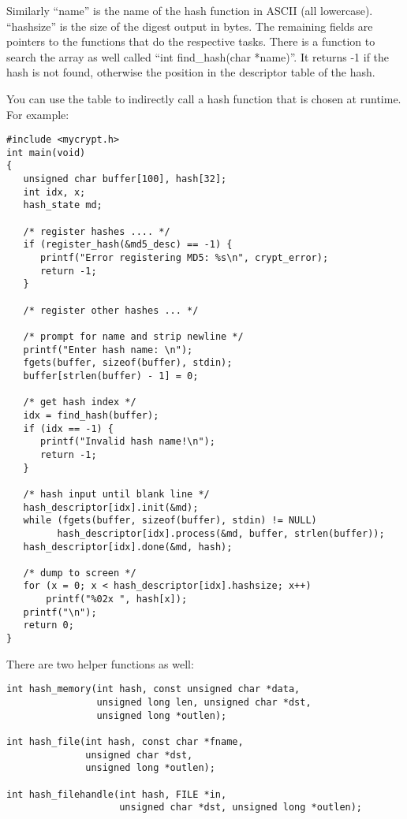 \documentclass{book}
\begin{document}
Similarly ``name'' is the name of the hash function in ASCII (all lowercase).  ``hashsize'' is the size of the digest output
in bytes.  The remaining fields are pointers to the functions that do the respective tasks.  There is a function to
search the array as well called ``int find\_hash(char *name)''.  It returns -1 if the hash is not found, otherwise the
position in the descriptor table of the hash.

You can use the table to indirectly call a hash function that is chosen at runtime.  For example:
\begin{small}
\begin{verbatim}
#include <mycrypt.h>
int main(void)
{
   unsigned char buffer[100], hash[32];
   int idx, x;
   hash_state md;

   /* register hashes .... */
   if (register_hash(&md5_desc) == -1) {
      printf("Error registering MD5: %s\n", crypt_error);
      return -1;
   }

   /* register other hashes ... */

   /* prompt for name and strip newline */
   printf("Enter hash name: \n");
   fgets(buffer, sizeof(buffer), stdin);
   buffer[strlen(buffer) - 1] = 0;

   /* get hash index */
   idx = find_hash(buffer);
   if (idx == -1) {
      printf("Invalid hash name!\n");
      return -1;
   }

   /* hash input until blank line */
   hash_descriptor[idx].init(&md);
   while (fgets(buffer, sizeof(buffer), stdin) != NULL)
         hash_descriptor[idx].process(&md, buffer, strlen(buffer));
   hash_descriptor[idx].done(&md, hash);

   /* dump to screen */
   for (x = 0; x < hash_descriptor[idx].hashsize; x++)
       printf("%02x ", hash[x]);
   printf("\n");
   return 0;
}
\end{verbatim}
\end{small}

There are two helper functions as well:
 
\begin{verbatim}
int hash_memory(int hash, const unsigned char *data, 
                unsigned long len, unsigned char *dst,
                unsigned long *outlen);

int hash_file(int hash, const char *fname, 
              unsigned char *dst,
              unsigned long *outlen);

int hash_filehandle(int hash, FILE *in, 
                    unsigned char *dst, unsigned long *outlen);
\end{verbatim}
\end{document}

